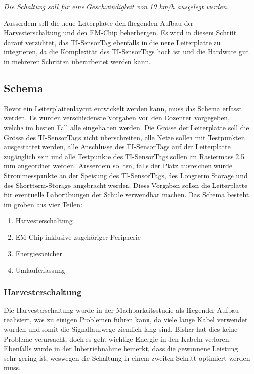 \textit{Die Schaltung soll für eine Geschwindigkeit von 10 km/h ausgelegt werden.}

Ausserdem soll die neue Leiterplatte den fliegenden Aufbau der Harvesterschaltung und den EM-Chip beherbergen. Es wird in diesem Schritt darauf verzichtet, das TI-SensorTag ebenfalls in die neue Leiterplatte zu integrieren, da die Komplexität des TI-SensorTags hoch ist und die Hardware gut in mehreren Schritten überarbeitet werden kann.

\subsection{Schema}

Bevor ein Leiterplattenlayout entwickelt werden kann, muss das Schema erfasst werden. Es wurden verschiedenste Vorgaben von den Dozenten vorgegeben, welche im besten Fall alle eingehalten werden. Die Grösse der Leiterplatte soll die Grösse des TI-SensorTags nicht überschreiten, alle Netze sollen mit Testpunkten ausgestattet werden, alle Anschlüsse des TI-SensorTags auf der Leiterplatte zugänglich sein und alle Testpunkte des TI-SensorTags sollen im Rastermass 2.5 mm angeordnet werden. Ausserdem sollten, falls der Platz ausreichen würde, Strommesspunkte an der Speisung des TI-SensorTags, des Longterm Storage und des Shortterm-Storage angebracht werden. Diese Vorgaben sollen die Leiterplatte für eventuelle Laborübungen der Schule verwendbar machen. Das Schema besteht im groben aus vier Teilen:

\begin{enumerate}
    \item Harvesterschaltung
    \item EM-Chip inklusive zugehöriger Peripherie
    \item Energiespeicher
    \item Umlauferfassung
\end{enumerate}

\subsubsection{Harvesterschaltung}
Die Harvesterschaltung wurde in der Machbarkeitsstudie als fliegender Aufbau realisiert, was zu einigen Problemen führen kann, da viele lange Kabel verwendet wurden und somit die Signallaufwege ziemlich lang sind. Bisher hat dies keine Probleme verursacht, doch es geht wichtige Energie in den Kabeln verloren. Ebenfalls wurde in der Inbetriebnahme bemerkt, dass die gewonnene Leistung sehr gering ist, weswegen die Schaltung in einem zweiten Schritt optimiert werden muss.

